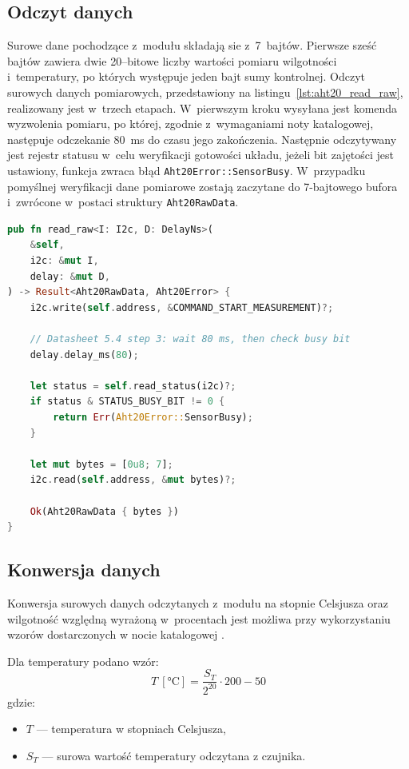 \subsection*{Odczyt danych}
Surowe dane pochodzące z~modułu składają sie z~7~bajtów.
Pierwsze sześć bajtów zawiera dwie 20--bitowe liczby wartości pomiaru
wilgotności i~temperatury, po których występuje jeden bajt sumy kontrolnej.
Odczyt surowych danych pomiarowych, przedstawiony na 
listingu~\ref{lst:aht20_read_raw}, realizowany jest w~trzech etapach. 
W~pierwszym kroku wysyłana jest komenda wyzwolenia pomiaru, po której, 
zgodnie z~wymaganiami noty katalogowej, następuje odczekanie 
\SI{80}{\milli\second} do czasu jego zakończenia. 
Następnie odczytywany jest rejestr statusu w~celu weryfikacji gotowości układu, 
jeżeli bit zajętości jest ustawiony, funkcja zwraca błąd 
\texttt{Aht20Error::SensorBusy}. 
W~przypadku pomyślnej weryfikacji dane pomiarowe zostają zaczytane do 
7-bajtowego bufora i~zwrócone w~postaci struktury \texttt{Aht20RawData}.

\begin{lstlisting}[language=Rust, style=colouredRust, caption={Odczyt surowych danych z modułu AHT20},
                   label={lst:aht20_read_raw}]
pub fn read_raw<I: I2c, D: DelayNs>(
    &self,
    i2c: &mut I,
    delay: &mut D,
) -> Result<Aht20RawData, Aht20Error> {
    i2c.write(self.address, &COMMAND_START_MEASUREMENT)?;

    // Datasheet 5.4 step 3: wait 80 ms, then check busy bit
    delay.delay_ms(80);

    let status = self.read_status(i2c)?;
    if status & STATUS_BUSY_BIT != 0 {
        return Err(Aht20Error::SensorBusy);
    }

    let mut bytes = [0u8; 7];
    i2c.read(self.address, &mut bytes)?;

    Ok(Aht20RawData { bytes })
}
\end{lstlisting}

\subsection*{Konwersja danych}
Konwersja surowych danych odczytanych z~modułu na stopnie Celsjusza oraz 
wilgotność względną wyrażoną w~procentach jest możliwa przy wykorzystaniu 
wzorów dostarczonych w nocie katalogowej \cite{AHT20}. 

Dla temperatury podano wzór:
\begin{equation}
    T~[\si{\degreeCelsius}] = \frac{S_T}{2^{20}} \cdot 200 - 50
    \label{eq:aht20_temperature}
\end{equation}
\noindent gdzie:
\begin{itemize}
    \item $T$ --- temperatura w stopniach Celsjusza,
    \item $S_T$ --- surowa wartość temperatury odczytana z czujnika.
\end{itemize}


